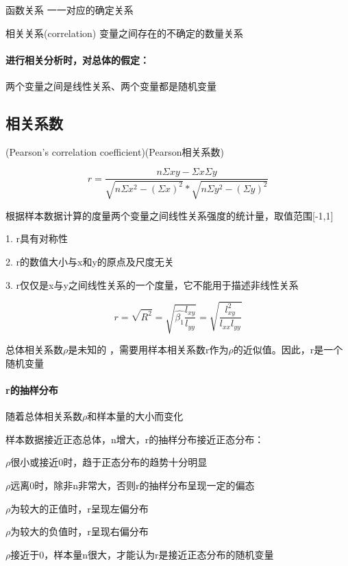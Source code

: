 \documentclass[UTF8,10pt]{book}
\begin{document}
{函数关系	一一对应的确定关系

相关关系(correlation)	变量之间存在的不确定的数量关系

\paragraph{进行相关分析时，对总体的假定：}	
两个变量之间是线性关系、两个变量都是随机变量

\subsection{相关系数}
    (Pearson's correlation coefficient)(Pearson相关系数)	

    $$ r = \frac{n \Sigma xy -\Sigma x \Sigma y }{\sqrt{n \Sigma x^2 - \left( \Sigma x \right)^2} * \sqrt{n \Sigma y^2 - \left( \Sigma y \right)^2} } $$ 




    根据样本数据计算的度量两个变量之间线性关系强度的统计量，取值范围[-1,1]

    1. r具有对称性

    2. r的数值大小与x和y的原点及尺度无关

    3. r仅仅是x与y之间线性关系的一个度量，它不能用于描述非线性关系 

    $$ r = \sqrt{R^2}=\sqrt{\hat{\beta_1} \frac{l_{xy}}{l_{yy}}} = \sqrt{\frac{l^2_{x y} }{l_{ x x } l_{y y}}}$$

    总体相关系数$\rho$是未知的 ，需要用样本相关系数r作为$\rho$的近似值。因此，r是一个随机变量

\paragraph{r的抽样分布} 随着总体相关系数$\rho$和样本量的大小而变化	

    样本数据接近正态总体，n增大，r的抽样分布接近正态分布：

    $\rho$很小或接近0时，趋于正态分布的趋势十分明显

    $\rho$远离0时，除非n非常大，否则r的抽样分布呈现一定的偏态 

    $\rho$为较大的正值时，r呈现左偏分布 

    $\rho$为较大的负值时，r呈现右偏分布 

    $\rho$接近于0，样本量n很大，才能认为r是接近正态分布的随机变量

}
\end{document}
